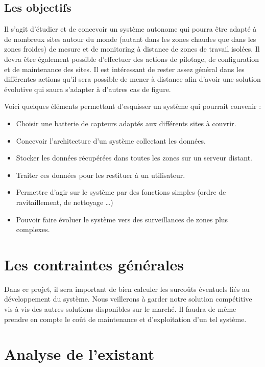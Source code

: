 \subsection{Les objectifs}

Il s'agit d'étudier et de concevoir un système autonome qui pourra être adapté à de nombreux sites autour du monde (autant dans les zones chaudes que dans les zones froides) de mesure et de monitoring à distance de zones de travail isolées. Il devra être également possible d'effectuer des actions de pilotage, de configuration et de maintenance des sites. Il est intéressant de rester assez général dans les différentes actions qu'il sera possible de mener à distance afin d'avoir une solution évolutive qui saura s'adapter à d'autres cas de figure.

Voici quelques éléments permettant d'esquisser un système qui pourrait convenir :

\begin{itemize}
\item Choisir une batterie de capteurs adaptés aux différents sites à couvrir.
\item Concevoir l'architecture d'un système collectant les données.
\item Stocker les données récupérées dans toutes les zones sur un serveur distant.
\item Traiter ces données pour les restituer à un utilisateur.
\item Permettre d'agir sur le système par des fonctions simples (ordre de ravitaillement, de nettoyage …)
\item Pouvoir faire évoluer le système vers des surveillances de zones plus complexes.
\end{itemize}
    
\section{Les contraintes générales}

Dans ce projet, il sera important de bien calculer les surcoûts éventuels liés au développement du système. Nous veillerons à garder notre solution compétitive vis à vis des autres solutions disponibles sur le marché. Il faudra de même prendre en compte le coût de maintenance et d'exploitation d'un tel système.

\section{Analyse de l'existant}

